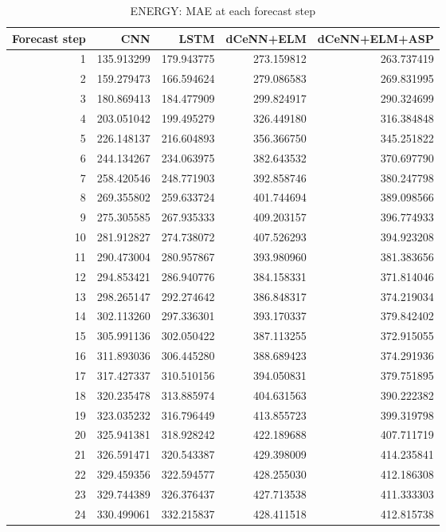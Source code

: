 \begin{table}
\caption{ENERGY: MAE at each forecast step}
\begin{tabular}{rrrrr}
\toprule
Forecast step & CNN & LSTM & dCeNN+ELM & dCeNN+ELM+ASP \\
\midrule
1 & 135.913299 & 179.943775 & 273.159812 & 263.737419 \\
2 & 159.279473 & 166.594624 & 279.086583 & 269.831995 \\
3 & 180.869413 & 184.477909 & 299.824917 & 290.324699 \\
4 & 203.051042 & 199.495279 & 326.449180 & 316.384848 \\
5 & 226.148137 & 216.604893 & 356.366750 & 345.251822 \\
6 & 244.134267 & 234.063975 & 382.643532 & 370.697790 \\
7 & 258.420546 & 248.771903 & 392.858746 & 380.247798 \\
8 & 269.355802 & 259.633724 & 401.744694 & 389.098566 \\
9 & 275.305585 & 267.935333 & 409.203157 & 396.774933 \\
10 & 281.912827 & 274.738072 & 407.526293 & 394.923208 \\
11 & 290.473004 & 280.957867 & 393.980960 & 381.383656 \\
12 & 294.853421 & 286.940776 & 384.158331 & 371.814046 \\
13 & 298.265147 & 292.274642 & 386.848317 & 374.219034 \\
14 & 302.113260 & 297.336301 & 393.170337 & 379.842402 \\
15 & 305.991136 & 302.050422 & 387.113255 & 372.915055 \\
16 & 311.893036 & 306.445280 & 388.689423 & 374.291936 \\
17 & 317.427337 & 310.510156 & 394.050831 & 379.751895 \\
18 & 320.235478 & 313.885974 & 404.631563 & 390.222382 \\
19 & 323.035232 & 316.796449 & 413.855723 & 399.319798 \\
20 & 325.941381 & 318.928242 & 422.189688 & 407.711719 \\
21 & 326.591471 & 320.543387 & 429.398009 & 414.235841 \\
22 & 329.459356 & 322.594577 & 428.255030 & 412.186308 \\
23 & 329.744389 & 326.376437 & 427.713538 & 411.333303 \\
24 & 330.499061 & 332.215837 & 428.411518 & 412.815738 \\
\bottomrule
\end{tabular}
\end{table}
